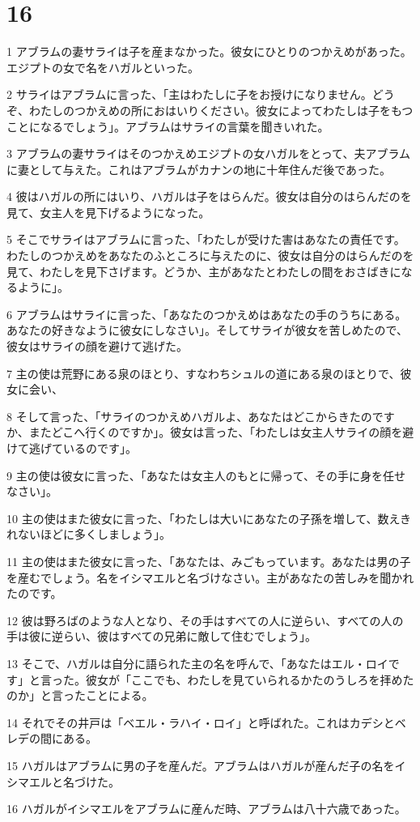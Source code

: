 \chapter{16}

\par 1 アブラムの妻サライは子を産まなかった。彼女にひとりのつかえめがあった。エジプトの女で名をハガルといった。
\par 2 サライはアブラムに言った、「主はわたしに子をお授けになりません。どうぞ、わたしのつかえめの所におはいりください。彼女によってわたしは子をもつことになるでしょう」。アブラムはサライの言葉を聞きいれた。
\par 3 アブラムの妻サライはそのつかえめエジプトの女ハガルをとって、夫アブラムに妻として与えた。これはアブラムがカナンの地に十年住んだ後であった。
\par 4 彼はハガルの所にはいり、ハガルは子をはらんだ。彼女は自分のはらんだのを見て、女主人を見下げるようになった。
\par 5 そこでサライはアブラムに言った、「わたしが受けた害はあなたの責任です。わたしのつかえめをあなたのふところに与えたのに、彼女は自分のはらんだのを見て、わたしを見下さげます。どうか、主があなたとわたしの間をおさばきになるように」。
\par 6 アブラムはサライに言った、「あなたのつかえめはあなたの手のうちにある。あなたの好きなように彼女にしなさい」。そしてサライが彼女を苦しめたので、彼女はサライの顔を避けて逃げた。
\par 7 主の使は荒野にある泉のほとり、すなわちシュルの道にある泉のほとりで、彼女に会い、
\par 8 そして言った、「サライのつかえめハガルよ、あなたはどこからきたのですか、またどこへ行くのですか」。彼女は言った、「わたしは女主人サライの顔を避けて逃げているのです」。
\par 9 主の使は彼女に言った、「あなたは女主人のもとに帰って、その手に身を任せなさい」。
\par 10 主の使はまた彼女に言った、「わたしは大いにあなたの子孫を増して、数えきれないほどに多くしましょう」。
\par 11 主の使はまた彼女に言った、「あなたは、みごもっています。あなたは男の子を産むでしょう。名をイシマエルと名づけなさい。主があなたの苦しみを聞かれたのです。
\par 12 彼は野ろばのような人となり、その手はすべての人に逆らい、すべての人の手は彼に逆らい、彼はすべての兄弟に敵して住むでしょう」。
\par 13 そこで、ハガルは自分に語られた主の名を呼んで、「あなたはエル・ロイです」と言った。彼女が「ここでも、わたしを見ていられるかたのうしろを拝めたのか」と言ったことによる。
\par 14 それでその井戸は「ベエル・ラハイ・ロイ」と呼ばれた。これはカデシとベレデの間にある。
\par 15 ハガルはアブラムに男の子を産んだ。アブラムはハガルが産んだ子の名をイシマエルと名づけた。
\par 16 ハガルがイシマエルをアブラムに産んだ時、アブラムは八十六歳であった。

